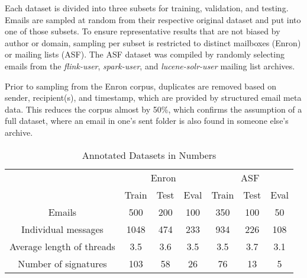 \documentclass{llncs}
\begin{document}
Each dataset is divided into three subsets for training, validation, and testing.
Emails are sampled at random from their respective original dataset and put into one of those subsets.
To ensure representative results that are not biased by author or domain, sampling per subset is restricted to distinct mailboxes (Enron) or mailing lists (ASF).
The ASF dataset was compiled by randomly selecting emails from the \textit{flink-user}, \textit{spark-user}, and \textit{lucene-solr-user} mailing list archives.

Prior to sampling from the Enron corpus, duplicates are removed based on sender, recipient(s), and timestamp, which are provided by structured email meta data.
This reduces the corpus almost by 50\%, which confirms the assumption of a full dataset, where an email in one's sent folder is also found in someone else's archive.

\begin{table}
	\caption{Annotated Datasets in Numbers}
	\label{tab:dataset}
	\centering
	\begin{tabular*}{\textwidth}{@{\extracolsep{\fill}} ccccccc}
		\toprule
		& \multicolumn{3}{c}{Enron} &  \multicolumn{3}{c}{ASF} \\
		\cmidrule{2-4}
		\cmidrule{5-7}
		                          & Train    & Test   & Eval   & Train   & Test   & Eval  \\
		\midrule
		Emails                    & 500      & 200    & 100    &  350   &  100   &   50   \\
		Individual messages       & 1048     & 474    & 233    &  934   &  226   &   108  \\
		Average length of threads & 3.5      & 3.6    & 3.5    &  3.5   &  3.7   &   3.1  \\
		Number of signatures      & 103      & 58     & 26     &  76    &  13    &   5    \\
		\bottomrule
	\end{tabular*}
\end{table}
\end{document}
